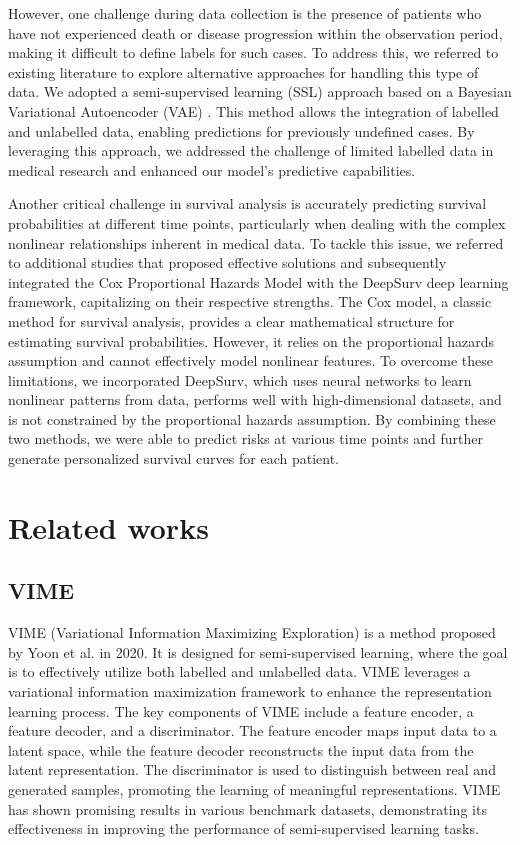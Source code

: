 \documentclass[conference]{ieeeconf}
\begin{document}
However, one challenge during data collection is the presence of patients who have
not experienced death or disease progression within the observation period, making
it difficult to define labels for such cases. To address this, we referred to existing
literature to explore alternative approaches for handling this type of data. We
adopted a semi-supervised learning (SSL) approach based on a Bayesian Variational
Autoencoder (VAE) \cite{hsu2023learning}. This method allows the integration of labelled and
unlabelled data, enabling predictions for previously undefined cases. By
leveraging this approach, we addressed the challenge of limited labelled data in
medical research and enhanced our model’s predictive capabilities.

Another critical challenge in survival analysis is accurately predicting survival
probabilities at different time points, particularly when dealing with the complex
nonlinear relationships inherent in medical data. To tackle this issue, we referred
to additional studies that proposed effective solutions \cite{katzman2018deepsurv} and subsequently
integrated the Cox Proportional Hazards Model with the DeepSurv deep learning
framework, capitalizing on their respective strengths. The Cox model, a classic
method for survival analysis, provides a clear mathematical structure for
estimating survival probabilities. However, it relies on the proportional
hazards assumption and cannot effectively model nonlinear features. To overcome
these limitations, we incorporated DeepSurv, which uses neural networks to learn
nonlinear patterns from data, performs well with high-dimensional datasets, and
is not constrained by the proportional hazards assumption. By combining these two
methods, we were able to predict risks at various time points and further generate
personalized survival curves for each patient.


\section{Related works}

\subsection{VIME}

VIME (Variational Information Maximizing Exploration) \cite{bahri2022scarf}
is a method proposed by 
Yoon et al. in 2020. It is designed for semi-supervised learning, where the goal
is to effectively utilize both labelled and unlabelled data. VIME leverages a
variational information maximization framework to enhance the representation 
learning process. The key components of VIME include a feature encoder, a 
feature decoder, and a discriminator. The feature encoder maps input data to 
a latent space, while the feature decoder reconstructs the input data from the 
latent representation. The discriminator is used to distinguish between real
and generated samples, promoting the learning of meaningful representations.
VIME has shown promising results in various benchmark datasets, demonstrating
its effectiveness in improving the performance of semi-supervised learning tasks.
\end{document}
